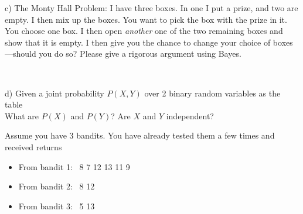 c) The Monty Hall Problem: I have three boxes. In one I put a prize,
and two are empty. I then mix up the boxes. You want to pick the box
with the prize in it. You choose one box. I then open \emph{another}
one of the two remaining boxes and show that it is empty. I then give
you the chance to change your choice of boxes---should you do so? Please give a rigorous argument using Bayes.

~

d) Given a joint probability $P(X,Y)$ over 2 binary random variables
as the table\\
What are $P(X)$ and $P(Y)$? Are $X$ and $Y$ independent?








Assume you have 3 bandits. You have already tested them a few times
and received returns
\begin{itemize}
\item From bandit 1:~ 8 7 12 13 11 9
\item From bandit 2:~ 8 12
\item From bandit 3:~ 5 13
\end{itemize}

